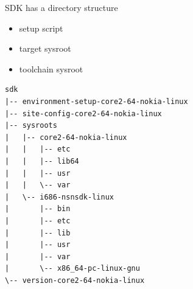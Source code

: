 \documentclass{beamer}
\begin{document}
\begin{frame}[fragile]{SDK has a directory structure}
\begin{block}{}
\begin{itemize}
\item{setup script}
\item{target sysroot}
\item{toolchain sysroot}
\end{itemize}
\end{block}
\begin{lstlisting}[style=TinyConsole]
sdk
|-- environment-setup-core2-64-nokia-linux
|-- site-config-core2-64-nokia-linux
|-- sysroots
|   |-- core2-64-nokia-linux
|   |   |-- etc
|   |   |-- lib64
|   |   |-- usr
|   |   \-- var
|   \-- i686-nsnsdk-linux
|       |-- bin
|       |-- etc
|       |-- lib
|       |-- usr
|       |-- var
|       \-- x86_64-pc-linux-gnu
\-- version-core2-64-nokia-linux
\end{lstlisting}
\end{frame}
\end{document}
